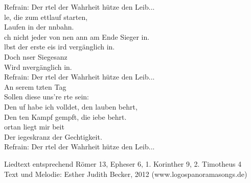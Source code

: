 Refrain:	Der rtel der Wahrheit hütze den Leib...\\

le, die zum ettlauf starten, \\
Laufen in der nnbahn.\\
ch nicht jeder von nen ann am Ende Sieger 
in.\\
lbst der erste eis ird vergänglich in.\\
Doch nser Siegesanz \\
Wird nvergänglich in.\\

Refrain:	Der rtel der Wahrheit hütze den Leib...\\

An serem tzten Tag\\
Sollen diese uns're rte sein:\\
Den uf habe ich volldet, den lauben behrt,\\
Den ten Kampf gempft, die iebe behrt.\\
ortan liegt mir beit\\
Der iegeskranz der Gechtigkeit.\\

Refrain:	Der rtel der Wahrheit hütze den Leib...\\

\begin{footnotesize}
Liedtext entsprechend Römer 13, Epheser 6, 1. Korinther 9, 2. Timotheus 4\\
Text und Melodie: Esther Judith Becker, 2012 (www.logospanoramasongs.de)
\end{footnotesize}